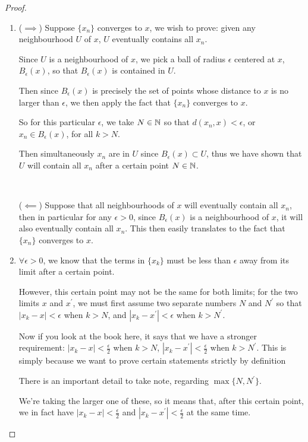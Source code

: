 \begin{proof} \
\begin{enumerate}[label=(\arabic*)]
\item ($\implies$) Suppose $\{x_n\}$ converges to $x$, we wish to prove: given any neighbourhood $U$ of $x$, $U$ eventually contains all $x_n$.

Since $U$ is a neighbourhood of $x$, we pick a ball of radius $\epsilon$ centered at $x$, $B_\epsilon(x)$, so that $B_\epsilon(x)$ is contained in $U$.

Then since $B_\epsilon(x)$ is precisely the set of points whose distance to $x$ is no larger than $\epsilon$, we then apply the fact that $\{x_n\}$ converges to $x$.

So for this particular $\epsilon$, we take $N\in\mathbb N$ so that $d(x_n,x)<\epsilon$, or $x_n\in B_\epsilon(x)$, for all $k>N$.

Then simultaneously $x_n$ are in $U$ since $B_\epsilon(x)\subset U$, thus we have shown that $U$ will contain all $x_n$ after a certain point $N\in\mathbb N$.

\

($\impliedby$) Suppose that all neighbourhoods of $x$ will eventually contain all $x_n$, then in particular for any $\epsilon>0$, since $B_\epsilon(x)$ is a neighbourhood of $x$, it will also eventually contain all $x_n$. This then easily translates to the fact that $\{x_n\}$ converges to $x$.

\item $\forall\epsilon>0$, we know that the terms in $\{x_k\}$ must be less than $\epsilon$ away from its limit after a certain point. 

However, this certain point may not be the same for both limits; for the two limits $x$ and $x^\prime$, we must first assume two separate numbers $N$ and $N^\prime$ so that $|x_k-x|<\epsilon$ when $k>N$, and $|x_k-x^\prime|<\epsilon$ when $k>N^\prime$.

Now if you look at the book here, it says that we have a stronger requirement:
$|x_k-x|<\frac{\epsilon}{2}$ when $k>N$,
$|x_k-x^\prime|<\frac{\epsilon}{2}$ when $k>N^\prime$.
This is simply because we want to prove certain statements strictly by definition



There is an important detail to take note, regarding $\max\{N,N^\prime\}$.

We're taking the larger one of these, so it means that, after this certain point, we in fact have $|x_k-x|<\frac{\epsilon}{2}$ and $|x_k-x^\prime|<\frac{\epsilon}{2}$ at the same time.


\end{enumerate}
\end{proof}
